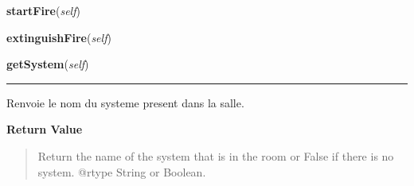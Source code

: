     \label{room:Room:startFire}

    \vspace{0.5ex}

\hspace{.8\funcindent}\begin{boxedminipage}{\funcwidth}

    \raggedright \textbf{startFire}(\textit{self})

\setlength{\parskip}{2ex}
\setlength{\parskip}{1ex}
    \end{boxedminipage}

    \label{room:Room:extinguishFire}

    \vspace{0.5ex}

\hspace{.8\funcindent}\begin{boxedminipage}{\funcwidth}

    \raggedright \textbf{extinguishFire}(\textit{self})

\setlength{\parskip}{2ex}
\setlength{\parskip}{1ex}
    \end{boxedminipage}

    \label{room:Room:getSystem}

    \vspace{0.5ex}

\hspace{.8\funcindent}\begin{boxedminipage}{\funcwidth}

    \raggedright \textbf{getSystem}(\textit{self})

    \vspace{-1.5ex}

    \rule{\textwidth}{0.5\fboxrule}
\setlength{\parskip}{2ex}
    Renvoie le nom du systeme present dans la salle.

\setlength{\parskip}{1ex}
      \textbf{Return Value}
    \vspace{-1ex}

      \begin{quote}
      Return the name of the system that is in the room or False if there 
      is no system. @rtype String or Boolean.

      \end{quote}

    \end{boxedminipage}

